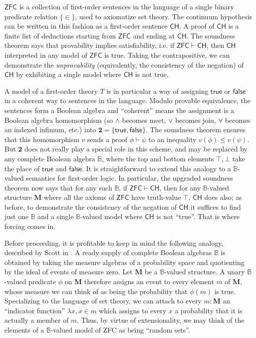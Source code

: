 \documentclass[a4paper,USenglish,cleveref, autoref]{lipics-v2019}
\newcommand{\B}{\mathbb{B}}
\begin{document}
$\mathsf{ZFC}$ is a collection of first-order sentences in the language of a single binary predicate relation $\{\in\}$, used to axiomatize set theory. The continuum hypothesis can be written in this fashion as a first-order sentence $\mathsf{CH}$. A proof of $\mathsf{CH}$ is a finite list of deductions starting from $\mathsf{ZFC}$ and ending at $\mathsf{CH}$. %
The soundness theorem says that provability implies satisfiability, i.e. if $\mathsf{ZFC} \vdash \mathsf{CH}$, then $\mathsf{CH}$ interpreted in any model of $\mathsf{ZFC}$ is true. Taking the contrapositive, we can demonstrate the \emph{unprovability} (equivalently, the consistency of the negation) of $\mathsf{CH}$ by exhibiting a single model where $\mathsf{CH}$ is not true.

A model of a first-order theory $T$ is in particular a way of assigning $\mathsf{true}$ or $\mathsf{false}$ in a coherent way to sentences in the language. Modulo provable equivalence, the sentences form a Boolean algebra and ``coherent'' means the assignment is a Boolean algebra homomorphism (so $\land$ becomes meet, $\lor$ becomes join, $\forall$ becomes an indexed infimum, etc.) into $\mathbf{2} = \{\mathsf{true}, \mathsf{false}\}$. The soundness theorem ensures that this homomorphism $v$ sends a proof $\phi \vdash \psi$ to an inequality $v(\phi) \leq v(\psi)$. But $\mathbf{2}$ does not really play a special role in this scheme, and may be replaced by any complete Boolean algebra $\B$, where the top and bottom elements $\top, \bot$ take the place of $\mathsf{true}$ and $\mathsf{false}$. It is straightforward to extend this analogy to a $\B$-valued semantics for first-order logic. In particular, the upgraded soundness theorem now says that for any such $\B$, if $\mathsf{ZFC} \vdash \mathsf{CH}$, then for any $\B$-valued structure $\mathbf{M}$ where all the axioms of $\mathsf{ZFC}$ have truth-value $\top$, $\mathsf{CH}$ does also; as before, to demonstrate the consistency of the negation of $\mathsf{CH}$ it suffices to find just one $\mathbb{B}$ and a single $\mathbb{B}$-valued model where $\mathsf{CH}$ is not ``true''. That is where forcing comes in.

Before proceeding, it is profitable to keep in mind the following analogy, described by Scott in \cite{scott1}. A ready supply of complete Boolean algebras $\B$ is obtained by taking the measure algebras of a probability space and quotienting by the ideal of events of measure zero. Let $\mathbf{M}$ be a $\B$-valued structure. A unary $\B$-valued predicate $\phi$ on $\mathbf{M}$ therefore assigns an event to every element $m$ of $\mathbf{M}$, whose measure we can think of as being the probability that $\phi(m)$ is true. Specializing to the language of set theory, we can attach to every $m : \mathbf{M}$ an ``indicator function'' $\lambda x, x \in m$ which assigns to every $x$ a probability that it is actually a member of $m$. Thus, by virtue of extensionality, we may think of the elements of a $\B$-valued model of ZFC as being ``random sets''.
\end{document}
